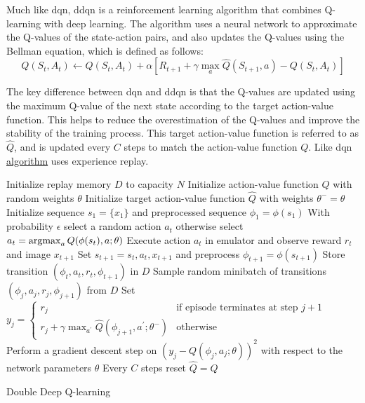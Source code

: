 Much like \gls{dqn}, \gls{ddqn} is a reinforcement learning algorithm that
combines Q-learning with deep learning. The algorithm uses a neural network to
approximate the Q-values of the state-action pairs, and also updates the
Q-values using the Bellman equation, which is defined as follows:
\begin{equation}
    Q(S_t, A_t) \leftarrow Q(S_t, A_t) + \alpha [R_{t+1} + \gamma \max_{a} \hat{Q}(S_{t+1}, a) - Q(S_t, A_t)]    
\end{equation}

The key difference between \gls{dqn} and \gls{ddqn} is that the Q-values are
updated using the maximum Q-value of the next state according to the target
action-value function. This helps to reduce the overestimation of the Q-values
and improve the stability of the training process. This target action-value
function is referred to as $\hat{Q}$, and is updated every $C$ steps to match
the action-value function $Q$. Like \gls{dqn} \hyperref[alg:ddqn]{algorithm}
uses experience replay.

\begin{algorithm}[H]
    \begin{algorithmic}[1]
        \State Initialize replay memory $D$ to capacity $N$
        \State Initialize action-value function $Q$ with random weights $\theta$
        \State Initialize target action-value function $\hat{Q}$ with weights $\theta^- = \theta$
            \State Initialize sequence $s_1 = \{x_1\}$ and preprocessed sequence $\phi_1 = \phi(s_1)$
                \State With probability $\epsilon$ select a random action $a_t$
                \State otherwise select $a_t = \operatorname{argmax}_a Q(\phi(s_t), a; \theta)$
                \State Execute action $a_t$ in emulator and observe reward $r_t$ and image $x_{t+1}$
                \State Set $s_{t+1} = s_t, a_t, x_{t+1}$ and preprocess $\phi_{t+1} = \phi(s_{t+1})$
                \State Store transition $(\phi_t, a_t, r_t, \phi_{t+1})$ in $D$
                \State Sample random minibatch of transitions $(\phi_j, a_j, r_j, \phi_{j+1})$ from $D$
                \State Set $y_j = \begin{cases}
                    r_j & \text{if episode terminates at step } j+1 \\
                    r_j + \gamma \max_{a^\prime} \hat{Q}(\phi_{j+1}, a^\prime; \theta^-) & \text{otherwise}
                \end{cases}$
                \State Perform a gradient descent step on $(y_j - Q(\phi_j, a_j; \theta))^2$ with respect to the network parameters $\theta$
                \State Every $C$ steps reset $\hat{Q} = Q$
            \EndFor
        \EndFor
    \end{algorithmic}
    \caption{Double Deep Q-learning}
    \label{alg:ddqn}
\end{algorithm}